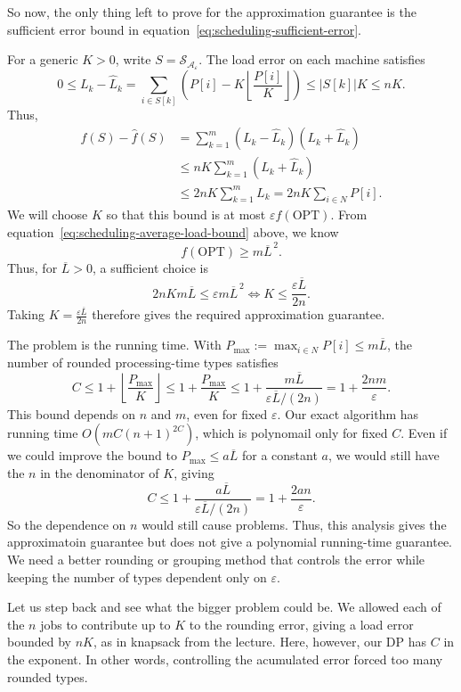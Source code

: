 \documentclass[12pt,a4paper]{article}
\begin{document}
So now, the only thing left to prove for the approximation guarantee is
the sufficient error bound in equation~\eqref{eq:scheduling-sufficient-error}.

For a generic $K>0$, write $S=\mathcal{S}_{\mathcal{A}_{\varepsilon}}$.
The load error on each machine satisfies
\[
0\leq L_k-\widehat{L}_k
=\sum_{i\in S[k]}\left(P[i]-K\left\lfloor\frac{P[i]}{K}\right\rfloor\right)
\leq |S[k]|K\leq nK.
\]
Thus,
\[
\begin{aligned}
f(S)-\widehat{f}(S)
&=\sum_{k=1}^{m}(L_k-\widehat{L}_k)(L_k+\widehat{L}_k)\\
&\leq nK\sum_{k=1}^{m}(L_k+\widehat{L}_k)\\
&\leq 2nK\sum_{k=1}^{m}L_k
=2nK\sum_{i\in N}P[i].
\end{aligned}
\]
We will choose $K$ so that this bound is at most $\varepsilon f(\mathrm{OPT})$.
From equation~\eqref{eq:scheduling-average-load-bound} above, we know
\[
f(\mathrm{OPT})\geq m\overline{L}^{\,2}.
\]
Thus, for $\overline{L}>0$, a sufficient choice is
\[
2nKm\overline{L}\leq\varepsilon m\overline{L}^{\,2}
\iff K\leq\frac{\varepsilon\overline{L}}{2n}.
\]
Taking $K=\frac{\varepsilon\overline{L}}{2n}$ therefore gives the required
approximation guarantee.

The problem is the running time. With
$P_{\max}:=\max_{i\in N}P[i]\leq m\overline{L}$,
the number of rounded processing-time types satisfies
\[
C\leq1+\left\lfloor\frac{P_{\max}}{K}\right\rfloor
\leq1+\frac{P_{\max}}{K}
\leq1+\frac{m\overline{L}}{\varepsilon\overline{L}/(2n)}
=1+\frac{2nm}{\varepsilon}.
\]
This bound depends on $n$ and $m$, even for fixed $\varepsilon$.
Our exact algorithm has running time $O(mC(n+1)^{2C})$, which is
polynomail only for fixed $C$. Even if we could improve the bound to
$P_{\max}\leq a\overline{L}$ for a constant $a$, we would still have
the $n$ in the denominator of $K$, giving
\[
C\leq1+\frac{a\overline{L}}{\varepsilon\overline{L}/(2n)}
=1+\frac{2an}{\varepsilon}.
\]
So the dependence on $n$ would still cause problems.
Thus, this analysis gives the approximatoin
guarantee but does not give a polynomial running-time guarantee.
We need a better rounding or grouping method that controls the error
while keeping the number of types dependent only on $\varepsilon$.

Let us step back and see what the bigger problem could be. We allowed
each of the $n$ jobs to contribute up to $K$ to the rounding error, giving
a load error bounded by $nK$, as in knapsack from the lecture. Here,
however, our DP has $C$ in the exponent. In other words, controlling
the acumulated error forced too many rounded types.
\end{document}
